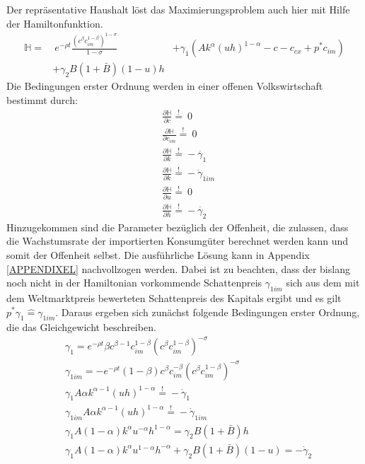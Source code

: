 Der repräsentative Haushalt löst das Maximierungsproblem auch hier mit Hilfe der Hamiltonfunktion.
%
\begin{equation}
	\begin{split}
		\mathbb{H}=&~e^{-\rho t}\frac{(c^\beta c_{im}^{1-\beta})^{1-\sigma}}{1-\sigma}
		&+\gamma_1(Ak^\alpha(uh)^{1-\alpha}-c-c_{ex}+p^*c_{im})\\
		&+\gamma_2B(1+\bar{B})(1-u)h
	\end{split}
\end{equation}
%
Die Bedingungen erster Ordnung werden in einer offenen Volkswirtschaft bestimmt durch:
%
\begin{align}
	&\frac{\partial\mathbb{H}}{\partial c}\overset{!}{=}~0\label{eq:lfoc1EL}\\
	&\frac{\partial\mathbb{H}}{\partial c_{im}}\overset{!}{=}~0\label{eq:lfoc1imEL}\\
	&\frac{\partial\mathbb{H}}{\partial k}\overset{!}{=}-\dot{\gamma_1}\label{eq:lfoc3EL}\\
	&\frac{\partial\mathbb{H}}{\partial k}\overset{!}{=}-\dot{\gamma}_{1im}\label{eq:lfoc3imEL}\\
	&\frac{\partial\mathbb{H}}{\partial u}\overset{!}{=}~0\label{eq:lfoc4EL}\\
	&\frac{\partial\mathbb{H}}{\partial h}\overset{!}{=}-\dot{\gamma_2}\label{eq:lfoc5EL}
\end{align}
%
Hinzugekommen sind die Parameter bezüglich der Offenheit, die zulassen, dass die Wachstumsrate der importierten Konsumgüter berechnet werden kann und somit der Offenheit selbst. Die ausführliche Lösung kann in Appendix \ref{APPENDIXEL} nachvollzogen werden. Dabei ist zu beachten, dass der bislang noch nicht in der Hamiltonian vorkommende Schattenpreis $\gamma_{1im}$ sich aus dem mit dem Weltmarktpreis bewerteten Schattenpreis des Kapitals ergibt und es gilt $p^*\gamma_{1} \hat{=} \gamma_{1im}$. Daraus ergeben sich zunächst folgende Bedingungen erster Ordnung, die das Gleichgewicht beschreiben.
%
\begin{align}
	&\gamma_1=e^{-\rho t}\beta c^{\beta-1}c_{im}^{1-\beta}(c^\beta c_{im}^{1-\beta})^{-\sigma}\label{eq:foc1EL}\\
	&\gamma_{1im}=-e^{-\rho t}(1-\beta) c^{\beta}c_{im}^{-\beta}(c^\beta c_{im}^{1-\beta})^{-\sigma}\label{eq:foc1imEL}\\
	&\gamma_{1}A \alpha k^{\alpha -1} (uh)^{1- \alpha}\overset{!}{=} - \dot{\gamma}_{1}\label{eq:foc2EL}\\
	&\gamma_{1im}A\alpha k^{\alpha -1}(uh)^{1- \alpha}\overset{!}{=} - \dot{\gamma}_{1im}\label{eq:foc2imEL}\\
	&\gamma_{1}A(1- \alpha) k^{\alpha}u^{- \alpha}h^{1- \alpha}  = \gamma_{2} B (1+\bar{B}) h \label{eq:foc3EL}\\
	&\gamma_{1} A (1- \alpha)k^{\alpha} u^{1- \alpha}  h^{- \alpha} + \gamma_{2} B (1+\bar{B}) (1- u) = - \dot{\gamma}_{2}\label{eq:foc4EL}
\end{align}
